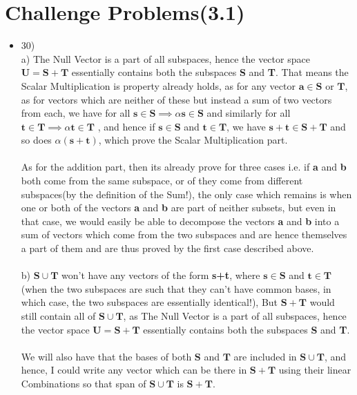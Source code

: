 \documentclass{article}
\begin{document}
\section{Challenge Problems(3.1)}
  \begin{itemize}
    \item 30) \\
    a) The Null Vector is a part of all subspaces, hence the vector space $\mathbf{U} = \mathbf{S+T}$ essentially contains both the subspaces \textbf{S} and \textbf{T}. That means the Scalar Multiplication is property already holds, as for any vector $\mathbf{a} \in \mathbf{S}$ or $\mathbf{T}$, as for vectors which are neither of these but instead a sum of two vectors from each, we have for all $\mathbf{s} \in \mathbf{S} \implies \alpha \mathbf{s} \in \mathbf{S}$ and similarly for all $\mathbf{t} \in \mathbf{T} \implies \alpha \mathbf{t} \in \mathbf{T}$ , and hence if $\mathbf{s} \in \mathbf{S}$ and $\mathbf{t} \in \mathbf{T}$, we have $\mathbf{s+t} \in \mathbf{S+T}$ and so does $\alpha (\mathbf{s + t})$, which prove the Scalar Multiplication part. \\~\\
    As for the addition part, then its already prove for three cases i.e. if \textbf{a} and \textbf{b} both come from the same subspace, or of they come from different subspaces(by the definition of the Sum!), the only case which remains is when one or both of the vectors \textbf{a} and \textbf{b} are part of neither subsets, but even in that case, we would easily be able to decompose the vectors \textbf{a} and \textbf{b} into a sum of vectors which come from the two subspaces and are hence themselves a part of them and are thus proved by the first case described above. \\~\\

    b) $\mathbf{S} \cup \mathbf{T}$ won't have any vectors of the form \textbf{s+t}, where $\mathbf{s} \in \mathbf{S}$ and $\mathbf{t} \in \mathbf{T}$ (when the two subspaces are such that they can't have common bases, in which case, the two subspaces are essentially identical!), But $\mathbf{S+T}$ would still contain all of $\mathbf{S} \cup \mathbf{T}$, as The Null Vector is a part of all subspaces, hence the vector space $\mathbf{U} = \mathbf{S+T}$ essentially contains both the subspaces \textbf{S} and \textbf{T}. \\~\\
    We will also have that the bases of both $\mathbf{S}$ and $\mathbf{T}$ are included in $\mathbf{S} \cup \mathbf{T}$, and hence, I could write any vector which can be there in $\mathbf{S+T}$ using their linear Combinations so that span of $\mathbf{S} \cup \mathbf{T}$ is $\mathbf{S+T}$.


\end{itemize}
\end{document}
